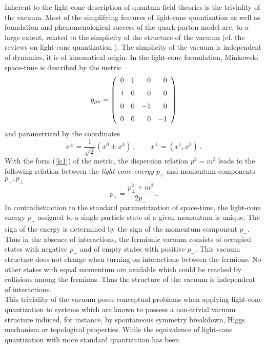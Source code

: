 \documentclass[a4paper,12pt]{article}
\begin{document}
\newpage\baselineskip=18pt


Inherent to the light-cone description of quantum field theories is the triviality of the vacuum.
Most of the simplifying features of  light-cone quantization as well as foundation and phenomenological
success of the quark-parton model are, to a large extent, related to the simplicity of the structure of the
vacuum (cf. the reviews on light-cone quantization \cite{Burkardt96,BPP98}). The simplicity of
the vacuum is independent of dynamics, it is of kinematical origin. In the light-cone formulation,
Minkowski space-time is described by the metric
\begin{equation}
  \label{lc1}
g_{\mu\nu}=\left (\begin {array}{rrrr} 0&1&0&0\\\noalign{\medskip}1&0
&0&0\\\noalign{\medskip}0&0&-1&0\\\noalign{\medskip}0&0&0&-1
\end {array}\right )\end{equation}
and  parametrized by the coordinates
$$x^{\pm}=\frac{1}{\sqrt{2}}(x^{0} \pm x^{3}) \ , \qquad
x^{\perp}=(x^{1},x^{2}) \ .$$
With the form (\ref{lc1}) of the metric, the dispersion relation $p^{2}=m^{2}$ leads to the
following relation between the {\em light-cone energy} $p_{+}$ and momentum
components $p_{-},p_{\perp}$
\begin{equation}
  \label{lc3}
  p_{+} = \frac{p_{\perp}^{2}+m^{2}}{2p_{-}} \ .
\end{equation}
In contradistinction to  the standard parametrization of space-time, the light-cone energy $p_{+}$
assigned to a single particle state of a given momentum is unique. The sign of the energy is determined
by the sign of the momentum component $p_{-}$. Thus  in the absence of interactions, the fermionic
vacuum consists of occupied states with negative $p_{-}$  and of empty states with positive $p_{-}$.
This vacuum structure does not change when turning on interactions between the fermions.
No other states with equal momentum are available which could be reached by collisions
among the fermions. Thus the structure of the vacuum is independent of interactions.\\
This triviality of the vacuum  poses conceptual problems when applying light-cone quantization to
systems which are known to possess a non-trivial vacuum structure induced, for instance, by
spontaneous symmetry breakdown, Higgs mechanism or topological properties.
While the equivalence of light-cone quantization with more standard quantization has been
\end{document}
